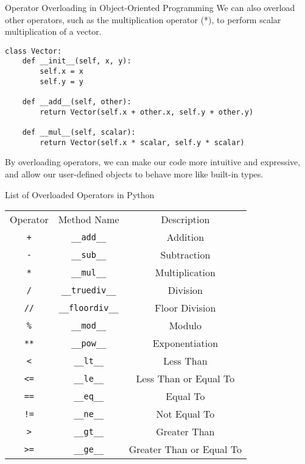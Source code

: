 \documentclass[handout]{beamer}
\begin{document}
\begin{frame}[fragile]{Operator Overloading in Object-Oriented Programming}
We can also overload other operators, such as the multiplication operator (*), to perform scalar multiplication of a vector.

\begin{lstlisting}[style=python]
class Vector:
    def __init__(self, x, y):
        self.x = x
        self.y = y

    def __add__(self, other):
        return Vector(self.x + other.x, self.y + other.y)

    def __mul__(self, scalar):
        return Vector(self.x * scalar, self.y * scalar)
\end{lstlisting}


By overloading operators, we can make our code more intuitive and expressive, and allow our user-defined objects to behave more like built-in types.
\end{frame}

\begin{frame}[fragile]{List of Overloaded Operators in Python}
\begin{center}
\begin{tabular}{ccc} 
 \rowcolor{gray!30}
 {Operator} & Method Name & Description \\
 \texttt{+} & \texttt{\_\_add\_\_} & Addition \\
 \rowcolor{gray!10}
 \texttt{-} & \texttt{\_\_sub\_\_} & Subtraction \\
 \texttt{*} & \texttt{\_\_mul\_\_} & Multiplication \\
 \rowcolor{gray!10}
 \texttt{/} & \texttt{\_\_truediv\_\_} & Division \\
 \texttt{//} & \texttt{\_\_floordiv\_\_} & Floor Division \\
 \rowcolor{gray!10}
 \texttt{\%} & \texttt{\_\_mod\_\_} & Modulo \\
 \texttt{**} & \texttt{\_\_pow\_\_} & Exponentiation \\
 \rowcolor{gray!10}
 \texttt{<} & \texttt{\_\_lt\_\_} & Less Than \\
 \texttt{<=} & \texttt{\_\_le\_\_} & Less Than or Equal To \\
 \rowcolor{gray!10}
 \texttt{==} & \texttt{\_\_eq\_\_} & Equal To \\
 \texttt{!=} & \texttt{\_\_ne\_\_} & Not Equal To \\
 \rowcolor{gray!10}
 \texttt{>} & \texttt{\_\_gt\_\_} & Greater Than \\
 \texttt{>=} & \texttt{\_\_ge\_\_} & Greater Than or Equal To \\
\end{tabular}
\end{center}
\end{frame}
\end{document}
